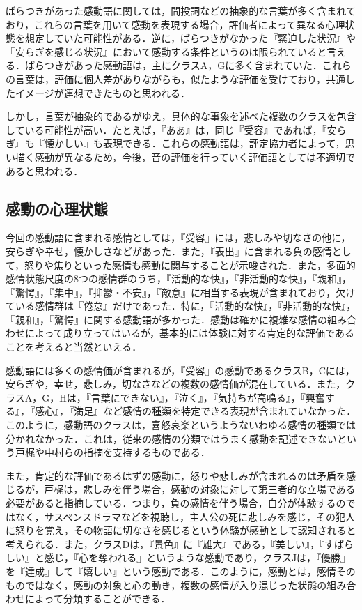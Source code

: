 \documentclass[japanese]{jnlp_1.3c}
\begin{document}
ばらつきがあった感動語に関しては，間投詞などの抽象的な言葉が多く含まれており，これらの言葉を用いて感動を表現する場合，評価者によって異なる心理状態を想定していた可能性がある．逆に，ばらつきがなかった『緊迫した状況』や『安らぎを感じる状況』において感動する条件というのは限られていると言える．ばらつきがあった感動語は，主にクラスA，Gに多く含まれていた．これらの言葉は，評価に個人差がありながらも，似たような評価を受けており，共通したイメージが連想できたものと思われる．


しかし，言葉が抽象的であるがゆえ，具体的な事象を述べた複数のクラスを包含している可能性が高い．たとえば，『ああ』は，同じ『受容』であれば，『安らぎ』も『懐かしい』も表現できる．これらの感動語は，評定協力者によって，思い描く感動が異なるため，今後，音の評価を行っていく評価語としては不適切であると思われる．



\subsection{感動の心理状態}
今回の感動語に含まれる感情としては，『受容』には，悲しみや切なさの他に，安らぎや幸せ，懐かしさなどがあった．また，『表出』に含まれる負の感情として，怒りや焦りといった感情も感動に関与することが示唆された．また，多面的感情状態尺度\cite{Article_005}の8つの感情群のうち，『活動的な快』，『非活動的な快』，『親和』，『驚愕』，『集中』，『抑鬱・不安』，『敵意』に相当する表現が含まれており，欠けている感情群は『倦怠』だけであった．特に，『活動的な快』，『非活動的な快』，『親和』，『驚愕』に関する感動語が多かった．感動は確かに複雑な感情の組み合わせによって成り立ってはいるが，基本的には体験に対する肯定的な評価であることを考えると当然といえる．


感動語には多くの感情価が含まれるが，『受容』の感動であるクラスB，Cには，安らぎや，幸せ，悲しみ，切なさなどの複数の感情価が混在している．また，クラスA，G，Hは，『言葉にできない』，『泣く』，『気持ちが高鳴る』，『興奮する』，『感心』，『満足』など感情の種類を特定できる表現が含まれていなかった．このように，感動語のクラスは，喜怒哀楽というようないわゆる感情の種類では分かれなかった．これは，従来の感情の分類ではうまく感動を記述できないという戸梶\cite{Article_006}や中村ら\cite{Inproc_203}の指摘を支持するものである．


また，肯定的な評価であるはずの感動に，怒りや悲しみが含まれるのは矛盾を感じるが，戸梶\cite{Article_006}は，悲しみを伴う場合，感動の対象に対して第三者的な立場である必要があると指摘している．つまり，負の感情を伴う場合，自分が体験するのではなく，サスペンスドラマなどを視聴し，主人公の死に悲しみを感じ，その犯人に怒りを覚え，その物語に切なさを感じるという体験が感動として認知されると考えられる．また，クラスDは，『景色』に『雄大』である，『美しい』，『すばらしい』と感じ，『心を奪われる』というような感動であり，クラスJは，『優勝』を『達成』して『嬉しい』という感動である．このように，感動とは，感情そのものではなく，感動の対象と心の動き，複数の感情が入り混じった状態の組み合わせによって分類することができる．
\end{document}
